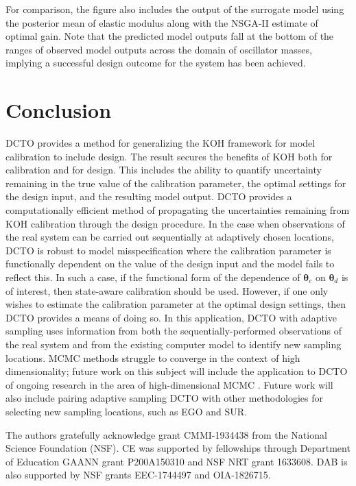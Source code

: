 \documentclass[10pt]{asme2ej}
\begin{document}
%
For comparison, the figure also includes the output of the surrogate model using the posterior mean of elastic modulus along with the NSGA-II estimate of optimal gain.
%
Note that the predicted model outputs fall at the bottom of the ranges of observed model outputs across the domain of oscillator masses, implying a successful design outcome for the system has been achieved.
%

%
\section{Conclusion}\label{sec:conclusion}
%
DCTO provides a method for generalizing the KOH framework for model calibration to include design.
%
The result secures the benefits of KOH both for calibration and for design.
%
This includes the ability to quantify uncertainty remaining in the true value of the calibration parameter, the optimal settings for the design input, and the resulting model output.
%
DCTO provides a computationally efficient method of propagating the uncertainties remaining from KOH calibration through the design procedure.
%
In the case when observations of the real system can be carried out sequentially at adaptively chosen locations, DCTO is robust to model misspecification where the calibration parameter is functionally dependent on the value of the design input and the model fails to reflect this.
%
In such a case, if the functional form of the dependence of $\boldsymbol\theta_c$ on $\boldsymbol\theta_d$ is of interest, then state-aware calibration should be used.
%
However, if one only wishes to estimate the calibration parameter at the optimal design settings, then DCTO provides a means of doing so.
%
In this application, DCTO with adaptive sampling uses information from both the sequentially-performed observations of the real system and from the existing computer model to identify new sampling locations.
%
MCMC methods struggle to converge in the context of high dimensionality; future work on this subject will include the application to DCTO of ongoing research in the area of high-dimensional MCMC \cite{Saibaba2019}.
%
Future work will also include pairing adaptive sampling DCTO with other methodologies for selecting new sampling locations, such as EGO and SUR.
%


\begin{acknowledgment}
The authors gratefully acknowledge grant CMMI-1934438 from the National Science Foundation (NSF). CE was supported by fellowships through Department of Education GAANN grant P200A150310 and NSF NRT grant 1633608. DAB is also supported by NSF grants EEC-1744497 and OIA-1826715.
\end{acknowledgment}
\end{document}
